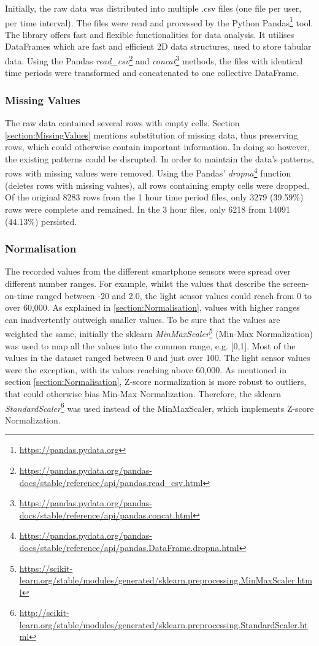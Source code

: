 Initially, the raw data was distributed into multiple .csv files (one file per user, per time interval). The files were read and processed by the Python Pandas\footnote{\url{https://pandas.pydata.org}} tool. The library offers fast and flexible functionalities for data analysis. It utilises DataFrames which are fast and efficient 2D data structures, used to store tabular data. Using the Pandas \textit{read\_csv}\footnote{\url{https://pandas.pydata.org/pandas-docs/stable/reference/api/pandas.read_csv.html}} and \textit{concat}\footnote{\url{https://pandas.pydata.org/pandas-docs/stable/reference/api/pandas.concat.html}} methods, the files with identical time periods were transformed and concatenated to one collective DataFrame. 


\subsubsection{Missing Values}
The raw data contained several rows with empty cells. Section \ref{section:MissingValues} mentions substitution of missing data, thus preserving rows, which could otherwise contain important information. In doing so however, the existing patterns could be disrupted. In order to maintain the data's patterns, rows with missing values were removed. Using the Pandas' \textit{dropna}\footnote{\url{https://pandas.pydata.org/pandas-docs/stable/reference/api/pandas.DataFrame.dropna.html}} function (deletes rows with missing values), all rows containing empty cells were dropped. Of the original 8283 rows from the 1 hour time period files, only 3279 (39.59\%) rows were complete and remained. In the 3 hour files, only 6218 from 14091 (44.13\%) persisted.

\subsubsection{Normalisation}
The recorded values from the different smartphone sensors were spread over different number ranges. For example, whilst the values that describe the screen-on-time ranged between -20 and 2.0, the light sensor values could reach from 0 to over 60,000. As explained in \ref{section:Normalisation}, values with higher ranges can inadvertently outweigh smaller values. To be sure that the values are weighted the same, initially the sklearn \textit{MinMaxScaler}\footnote{\url{https://scikit-learn.org/stable/modules/generated/sklearn.preprocessing.MinMaxScaler.html}} (Min-Max Normalization) was used to map all the values into the common range, e.g. [0,1]. Most of the values in the dataset ranged between 0 and just over 100. The light sensor values were the exception, with its values reaching above 60,000. As mentioned in section \ref{section:Normalisation}, Z-score normalization is more robust to outliers, that could otherwise bias Min-Max Normalization. Therefore, the sklearn \textit{StandardScaler}\footnote{\url{http://scikit-learn.org/stable/modules/generated/sklearn.preprocessing.StandardScaler.html}} was used instead of the MinMaxScaler, which implements Z-score Normalization.

